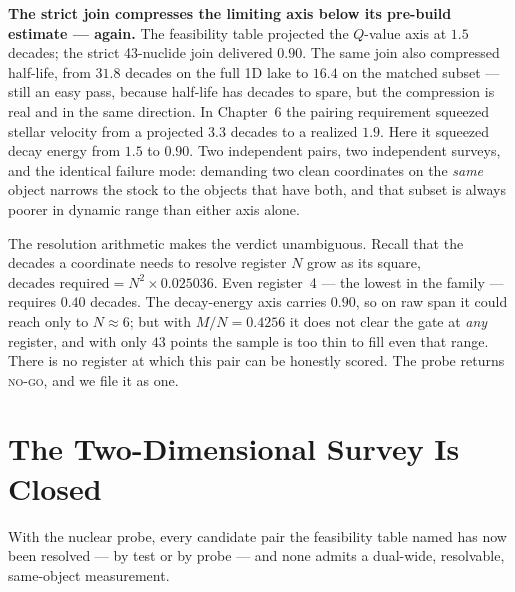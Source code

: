 \documentclass[11pt, letterpaper, openany]{book}
\begin{document}
\begin{correctionbox}
\textbf{The strict join compresses the limiting axis below its pre-build estimate --- again.} The
feasibility table projected the $Q$-value axis at $1.5$ decades; the strict 43-nuclide join delivered
$0.90$. The same join also compressed half-life, from $31.8$ decades on the full 1D lake to $16.4$
on the matched subset --- still an easy pass, because half-life has decades to spare, but the
compression is real and in the same direction. In Chapter~6 the pairing requirement squeezed stellar
velocity from a projected $3.3$ decades to a realized $1.9$. Here it squeezed decay energy from $1.5$
to $0.90$. Two independent pairs, two independent surveys, and the identical failure mode: demanding
two clean coordinates on the \emph{same} object narrows the stock to the objects that have both,
and that subset is always poorer in dynamic range than either axis alone.
\end{correctionbox}

The resolution arithmetic makes the verdict unambiguous. Recall that the decades a coordinate needs
to resolve register $N$ grow as its square, $\text{decades required} = N^2 \times 0.025036$. Even
register~4 --- the lowest in the family --- requires $0.40$ decades. The decay-energy axis carries
$0.90$, so on raw span it could reach only to $N \approx 6$; but with $M/N = 0.4256$ it does not
clear the gate at \emph{any} register, and with only $43$ points the sample is too thin to fill even
that range. There is no register at which this pair can be honestly scored. The probe returns
\textsc{no-go}, and we file it as one.

\section{The Two-Dimensional Survey Is Closed}

With the nuclear probe, every candidate pair the feasibility table named has now been resolved ---
by test or by probe --- and none admits a dual-wide, resolvable, same-object measurement.
\end{document}
